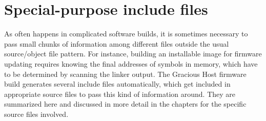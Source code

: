 \section{Special-purpose include files}

As often happens in complicated software builds, it is sometimes necessary
to pass small chunks of information among different files outside the usual
source/object file pattern.  For instance, building an installable image for
firmware updating requires knowing the final addresses of symbols in memory,
which have to be determined by scanning the linker output.
The Gracious Host firmware build generates
several include files automatically, which get included in appropriate
source files to pass this kind of information around.  They are summarized
here and discussed in more detail in the chapters for the specific source
files involved.

